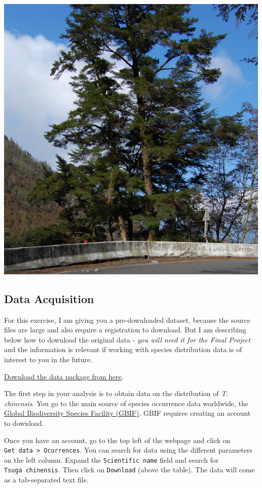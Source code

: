 \documentclass[
  letterpaper,
  DIV=11,
  numbers=noendperiod]{scrreprt}
\begin{document}
\includegraphics{images/lab_12/lab12_fig4_tsuga.jpg}

\subsection{Data Acquisition}\label{data-acquisition}

For this exercise, I am giving you a pre-downloaded dataset, because the
source files are large and also require a registration to download. But
I am describing below how to download the original data - \emph{you will
need it for the Final Project} and the information is relevant if
working with species distribution data is of interest to you in the
future.

\href{https://stir-my.sharepoint.com/:u:/g/personal/ala2_stir_ac_uk/EdX5iTojX65Mv3Jf_DD-PvEBGKnlQIuu7Njo5XFdu4SQmA?e=krTy3W}{Download
the data package from here}.

The first step in your analysis is to obtain data on the distribution of
\emph{T. chinensis}. You go to the main source of species occurrence
data worldwide, the \href{https://www.gbif.org/}{Global Biodiversity
Species Facility (GBIF)}. GBIF requires creating an account to download.

Once you have an account, go to the top left of the webpage and click on
\texttt{Get\ data\ \textgreater{}\ Ocurrences}. You can search for data
using the different parameters on the left column. Expand the
\texttt{Scientific\ name} field and search for
\texttt{Tsuga\ chinensis}. Then click on \texttt{Download} (above the
table). The data will come as a tab-separated text file.
\end{document}
